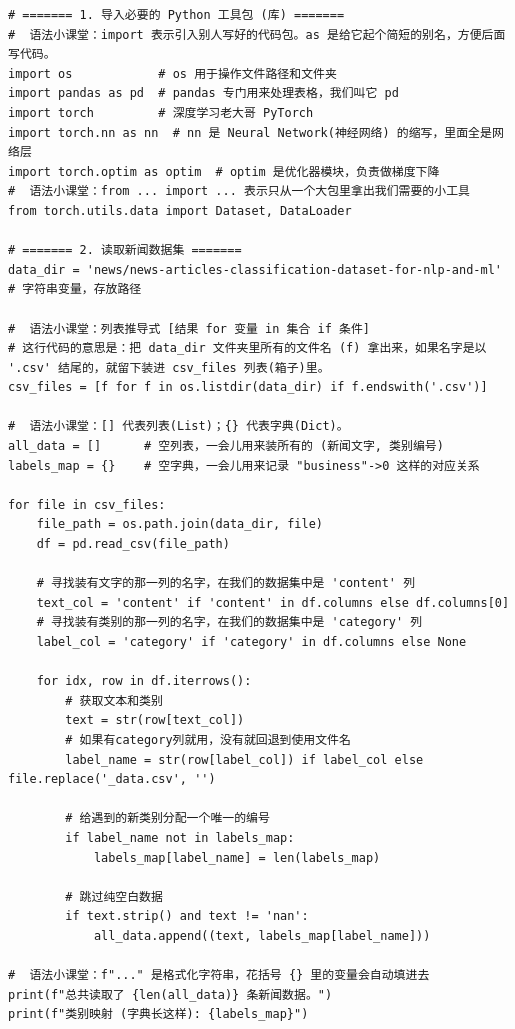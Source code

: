 \documentclass[10pt]{article}
\numberwithin{equation}{section}
\theoremstyle{plain}
\theoremstyle{definition}
\theoremstyle{remark}
\begin{document}
\begin{CodeBox}
	\begin{lstlisting}[style=PythonStyle]
# ======= 1. 导入必要的 Python 工具包 (库) =======
#  语法小课堂：import 表示引入别人写好的代码包。as 是给它起个简短的别名，方便后面写代码。
import os            # os 用于操作文件路径和文件夹
import pandas as pd  # pandas 专门用来处理表格，我们叫它 pd
import torch         # 深度学习老大哥 PyTorch
import torch.nn as nn  # nn 是 Neural Network(神经网络) 的缩写，里面全是网络层
import torch.optim as optim  # optim 是优化器模块，负责做梯度下降
#  语法小课堂：from ... import ... 表示只从一个大包里拿出我们需要的小工具
from torch.utils.data import Dataset, DataLoader 

# ======= 2. 读取新闻数据集 =======
data_dir = 'news/news-articles-classification-dataset-for-nlp-and-ml' # 字符串变量，存放路径

#  语法小课堂：列表推导式 [结果 for 变量 in 集合 if 条件]
# 这行代码的意思是：把 data_dir 文件夹里所有的文件名 (f) 拿出来，如果名字是以 '.csv' 结尾的，就留下装进 csv_files 列表(箱子)里。
csv_files = [f for f in os.listdir(data_dir) if f.endswith('.csv')]

#  语法小课堂：[] 代表列表(List)；{} 代表字典(Dict)。
all_data = []      # 空列表，一会儿用来装所有的 (新闻文字, 类别编号)
labels_map = {}    # 空字典，一会儿用来记录 "business"->0 这样的对应关系

for file in csv_files:
    file_path = os.path.join(data_dir, file)
    df = pd.read_csv(file_path)
    
    # 寻找装有文字的那一列的名字，在我们的数据集中是 'content' 列
    text_col = 'content' if 'content' in df.columns else df.columns[0]
    # 寻找装有类别的那一列的名字，在我们的数据集中是 'category' 列
    label_col = 'category' if 'category' in df.columns else None
    
    for idx, row in df.iterrows():
        # 获取文本和类别
        text = str(row[text_col])
        # 如果有category列就用，没有就回退到使用文件名
        label_name = str(row[label_col]) if label_col else file.replace('_data.csv', '')
        
        # 给遇到的新类别分配一个唯一的编号
        if label_name not in labels_map:
            labels_map[label_name] = len(labels_map)
            
        # 跳过纯空白数据
        if text.strip() and text != 'nan':
            all_data.append((text, labels_map[label_name]))

#  语法小课堂：f"..." 是格式化字符串，花括号 {} 里的变量会自动填进去
print(f"总共读取了 {len(all_data)} 条新闻数据。")
print(f"类别映射 (字典长这样): {labels_map}")
\end{lstlisting}
\end{CodeBox}
\end{document}
